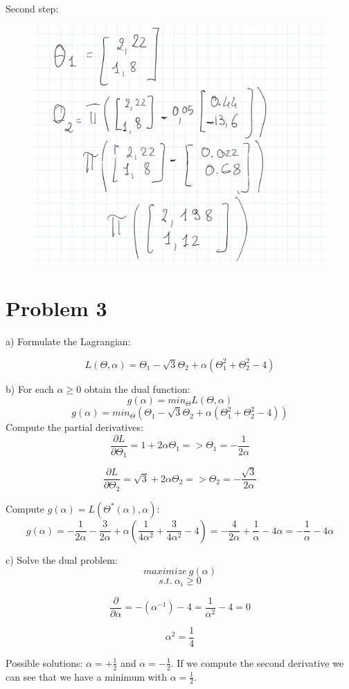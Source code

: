 \documentclass[12pt,letterpaper]{article}
\begin{document}
Second step:
\begin{figure}[H]
\centering
  \includegraphics[width=0.6\linewidth]{2.jpeg}
  
\end{figure}

\section*{Problem 3}

a) Formulate the Lagrangian:

$$L(\Theta, \alpha) = \Theta_1 - \sqrt{3}\Theta_2 + \alpha(\Theta_1^2 + \Theta_2^2-4)$$

b) For each $\alpha \geq 0$ obtain the dual function:
$$g(\alpha) = min_\Theta L(\Theta, \alpha)$$
$$g(\alpha) = min_\Theta (\Theta_1 - \sqrt{3} \Theta_2 + \alpha(\Theta_1^2+\Theta_2^2-4))$$
Compute the partial derivatives:
$$\frac{\partial L}{\partial \Theta_1} = 1+2\alpha\Theta_1 => \Theta_1 = -\frac{1}{2\alpha}$$ 

$$\frac{\partial L}{\partial \Theta_2} = \sqrt{3}+2\alpha\Theta_2 => \Theta_2 = -\frac{\sqrt{3}}{2\alpha}$$ 

Compute $g(\alpha) = L(\Theta^*(\alpha), \alpha)$:
$$g(\alpha) = -\frac{1}{2\alpha} - \frac{3}{2\alpha} + \alpha(\frac{1}{4\alpha^2}+\frac{3}{4\alpha^2}-4) = -\frac{4}{2\alpha}+\frac{1}{\alpha} - 4\alpha = -\frac{1}{\alpha}-4\alpha$$

c) Solve the dual problem: $$maximize\ g(\alpha)$$ $$s.t.\ \alpha_i \geq 0$$

$$\frac{\partial }{\partial \alpha} = -(\alpha^{-1})-4 = \frac{1}{\alpha^2}-4=0$$

$$\alpha^2 = \frac{1}{4}$$

Possible solutions: $\alpha = +\frac{1}{2}$ and $\alpha = -\frac{1}{2}$. If we compute the second derivative we can see that we have a minimum with $\alpha = \frac{1}{2}$.
\end{document}
